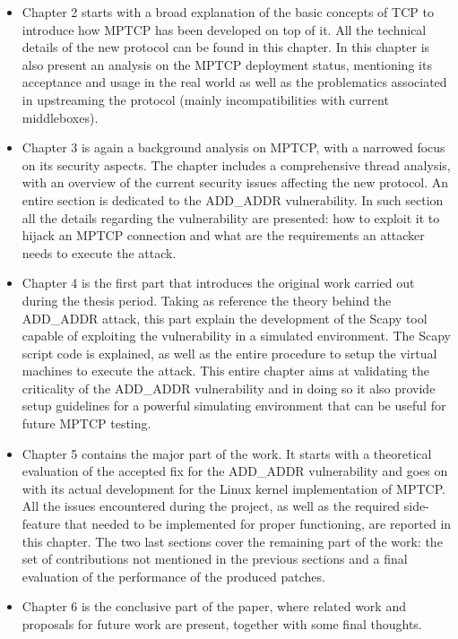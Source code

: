 \begin{itemize}
  \item Chapter 2 starts with a broad explanation of the basic concepts of TCP to introduce how MPTCP has been developed on top of it. All the technical details of the new protocol can be found in this chapter. In this chapter is also present an analysis on the MPTCP deployment status, mentioning its acceptance and usage in the real world as well as the problematics associated in upstreaming the protocol (mainly incompatibilities with current middleboxes).
  \item Chapter 3 is again a background analysis on MPTCP, with a narrowed focus on its security aspects. The chapter includes a comprehensive thread analysis, with an overview of the current security issues affecting the new protocol. An entire section is dedicated to the ADD\_ADDR vulnerability. In such section all the details regarding the vulnerability are presented: how to exploit it to hijack an MPTCP connection and what are the requirements  an attacker needs to execute the attack.
  \item Chapter 4 is the first part that introduces the original work carried out during the thesis period. Taking as reference the theory behind the ADD\_ADDR attack, this part explain the development of the Scapy tool capable of exploiting the vulnerability in a simulated environment. The Scapy script code is explained, as well as the entire procedure to setup the virtual machines to execute the attack. This entire chapter aims at validating the criticality of the ADD\_ADDR vulnerability and in doing so it also provide setup guidelines for a powerful simulating environment that can be useful for future MPTCP testing.
  \item Chapter 5 contains the major part of the work. It starts with a theoretical evaluation of the accepted fix for the ADD\_ADDR vulnerability and goes on with its actual development for the Linux kernel implementation of MPTCP. All the issues encountered during the project, as well as the required side-feature that needed to be implemented for proper functioning, are reported in this chapter. The two last sections cover the remaining part of the work: the set of contributions not mentioned in the previous sections and a final evaluation of the performance of the produced patches.
  \item Chapter 6 is the conclusive part of the paper, where related work and proposals for future work are present, together with some final thoughts.
\end{itemize}